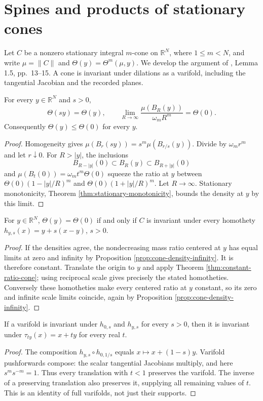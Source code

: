 \chapter{Spines and products of stationary cones}\label{sec:cone-spines-products}
Let $C$ be a nonzero stationary integral $m$-cone on $\mathbb R^N$, where $1\leq m<N$, and write $\mu=\|C\|$ and $\Theta(y)=\Theta^m(\mu,y)$. We develop the argument of \cite{Minter}, Lemma 1.5, pp.~13--15. A cone is invariant under dilations as a varifold, including the tangential Jacobian and the recorded planes.

\begin{proposition}\label{prop:cone-density-infinity}
For every $y\in\mathbb R^N$ and $s>0$,
\[
 \Theta(sy)=\Theta(y),\qquad
 \lim_{R\to\infty}\frac{\mu(B_R(y))}{\omega_mR^m}=\Theta(0).
\]
Consequently $\Theta(y)\leq\Theta(0)$ for every $y$.
\end{proposition}
\begin{proof}
Homogeneity gives $\mu(B_r(sy))=s^m\mu(B_{r/s}(y))$. Divide by $\omega_mr^m$ and let $r\downarrow0$. For $R>|y|$, the inclusions
\[
 B_{R-|y|}(0)\subset B_R(y)\subset B_{R+|y|}(0)
\]
and $\mu(B_t(0))=\omega_mt^m\Theta(0)$ squeeze the ratio at $y$ between $\Theta(0)(1-|y|/R)^m$ and $\Theta(0)(1+|y|/R)^m$. Let $R\to\infty$. Stationary monotonicity, Theorem \ref{thm:stationary-monotonicity}, bounds the density at $y$ by this limit.
\end{proof}

\begin{proposition}\label{prop:maximal-density-vertex}
For $y\in\mathbb R^N$, $\Theta(y)=\Theta(0)$ if and only if $C$ is invariant under every homothety $h_{y,s}(x)=y+s(x-y)$, $s>0$.
\end{proposition}
\begin{proof}
If the densities agree, the nondecreasing mass ratio centered at $y$ has equal limits at zero and infinity by Proposition \ref{prop:cone-density-infinity}. It is therefore constant. Translate the origin to $y$ and apply Theorem \ref{thm:constant-ratio-cone}; using reciprocal scale gives precisely the stated homotheties. Conversely these homotheties make every centered ratio at $y$ constant, so its zero and infinite scale limits coincide, again by Proposition \ref{prop:cone-density-infinity}.
\end{proof}

\begin{lemma}\label{lem:two-cone-vertices}
If a varifold is invariant under $h_{0,s}$ and $h_{y,s}$ for every $s>0$, then it is invariant under $\tau_{ty}(x)=x+ty$ for every real $t$.
\end{lemma}
\begin{proof}
The composition $h_{y,s}\circ h_{0,1/s}$ equals $x\mapsto x+(1-s)y$. Varifold pushforwards compose: the scalar tangential Jacobians multiply, and here $s^m s^{-m}=1$. Thus every translation with $t<1$ preserves the varifold. The inverse of a preserving translation also preserves it, supplying all remaining values of $t$. This is an identity of full varifolds, not just their supports.
\end{proof}

